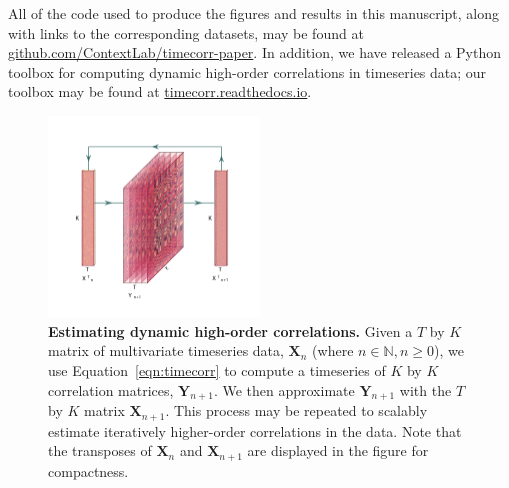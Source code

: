 \documentclass[english]{article}
\providecommand{\DIFaddend}{} %
\DeclareRobustCommand{\DIFaddend}{\DIFOaddend \let\includegraphics\DIFOincludegraphics} %
\begin{document}
\DIFaddend All of the code used to produce
the figures and results in this manuscript, along with links to the
corresponding datasets, may be found at
\href{https://github.com/ContextLab/timecorr-paper}{github.com/ContextLab/timecorr-paper}.
In addition, we have released a Python toolbox for computing dynamic
high-order correlations in timeseries data; our toolbox may be found
at
\href{https://timecorr.readthedocs.io/}{timecorr.readthedocs.io}.

\begin{figure}
  \centering
  \includegraphics[width=0.5\textwidth]{figs/methods_fig}
  \caption{\textbf{Estimating dynamic high-order correlations.}  Given
    a $T$ by $K$ matrix of multivariate timeseries data,
    $\mathbf{X}_n$ (where $n \in \mathbb{N}, n \geq 0$), we use
    Equation~\ref{eqn:timecorr} to compute a timeseries of
    $K$ by $K$ correlation matrices, $\mathbf{Y}_{n+1}$.  We then
    approximate $\mathbf{Y}_{n+1}$ with the $T$ by $K$ matrix
    $\mathbf{X}_{n+1}$.  This process may be repeated to scalably estimate
    iteratively higher-order correlations in the data.  Note that the
    transposes of $\mathbf{X}_n$ and $\mathbf{X}_{n+1}$ are displayed
    in the figure for compactness.
  \label{fig:methods}}
\end{figure}
\end{document}
